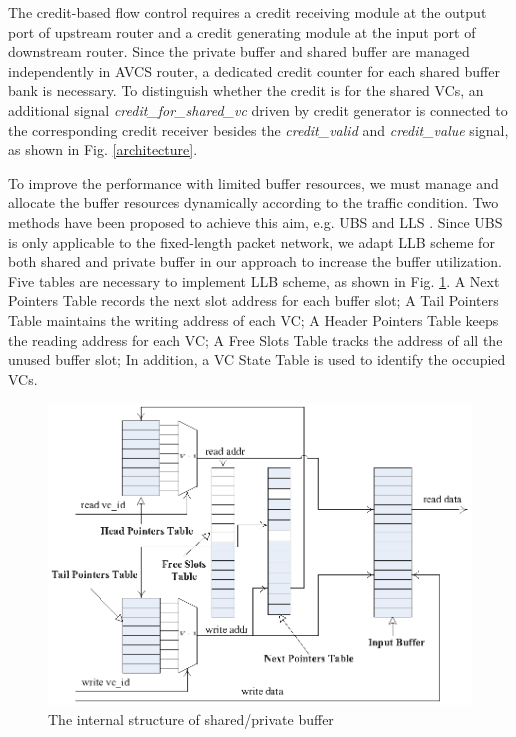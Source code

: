 \documentclass[paper]{ieice}
\begin{document}
The credit-based flow control requires a credit receiving module at the output port of upstream router and a credit generating module at the input port of downstream router. Since the private buffer and shared buffer are managed independently in AVCS router, a dedicated credit counter for each shared buffer bank is necessary. To distinguish whether the credit is for the shared VCs, an additional signal \emph{credit\_for\_shared\_vc} driven by credit generator is connected to the corresponding credit receiver besides the \emph{credit\_valid} and \emph{credit\_value} signal, as shown in Fig. \ref{architecture}.

To improve the performance with limited buffer resources, we must manage and allocate the buffer resources dynamically according to the traffic condition. Two methods have been proposed to achieve this aim, e.g. UBS \cite{NPKV06}\cite{5770788} and LLS \cite{4555894}\cite{Neishaburi:2009:RAN:1531542.1531658}. Since UBS is only applicable to the fixed-length packet network, we adapt LLB scheme for both shared and private buffer in our approach to increase the buffer utilization. Five tables are necessary to implement LLB scheme, as shown in Fig. \ref{linklist}. A Next Pointers Table records the next slot address for each buffer slot; A Tail Pointers Table maintains the writing address of each VC; A Header Pointers Table keeps the reading address for each VC; A Free Slots Table tracks the address of all the unused buffer slot; In addition, a VC State Table is used to identify the occupied VCs.
\begin{figure}
  \centering
  \includegraphics[scale=0.6]{figures/linklist.eps}
  \caption{The internal structure of shared/private buffer}\label{linklist}
\end{figure}
\end{document}
